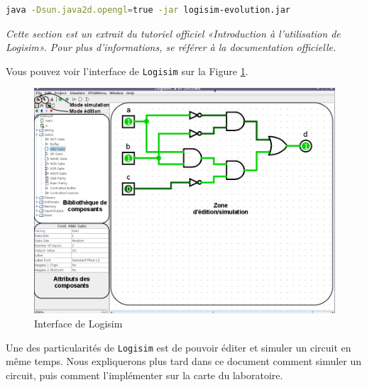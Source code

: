\documentclass{article}
\begin{document}
    \begin{lstlisting}[language=bash]
java -Dsun.java2d.opengl=true -jar logisim-evolution.jar
    \end{lstlisting} 

    \textit{Cette section est un extrait du tutoriel officiel «Introduction à l’utilisation de Logisim». Pour plus d'informations, se référer à la documentation officielle.}

    Vous pouvez voir l'interface de \texttt{Logisim} sur la Figure  \ref{fig_logisim_description}.

    \begin{figure}[t]
        \begin{center}
            \includegraphics[width=500pt]{pictures/Logisim_description.png}
            \caption{\label{fig_logisim_description}Interface de Logisim}
        \end{center}
    \end{figure}

    Une des particularités de \texttt{Logisim} est de pouvoir éditer et simuler un circuit en même temps.
    Nous expliquerons plus tard dans ce document comment simuler un circuit, puis comment l'implémenter sur la carte du
    laboratoire.


\end{document}
